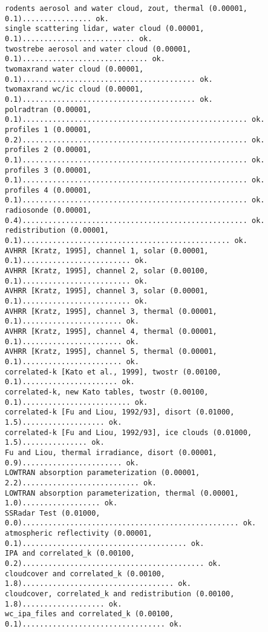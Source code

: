 \begin{enumerate}
\begin{lstlisting}[style=tinysize]
rodents aerosol and water cloud, zout, thermal (0.00001,   0.1)................ ok.
single scattering lidar, water cloud (0.00001,   0.1).......................... ok.
twostrebe aerosol and water cloud (0.00001,   0.1)............................. ok.
twomaxrand water cloud (0.00001,   0.1)........................................ ok.
twomaxrand wc/ic cloud (0.00001,   0.1)........................................ ok.
polradtran (0.00001,   0.1).................................................... ok.
profiles 1 (0.00001,   0.2).................................................... ok.
profiles 2 (0.00001,   0.1).................................................... ok.
profiles 3 (0.00001,   0.1).................................................... ok.
profiles 4 (0.00001,   0.1).................................................... ok.
radiosonde (0.00001,   0.4).................................................... ok.
redistribution (0.00001,   0.1)................................................ ok.
AVHRR [Kratz, 1995], channel 1, solar (0.00001,   0.1)......................... ok.
AVHRR [Kratz, 1995], channel 2, solar (0.00100,   0.1)......................... ok.
AVHRR [Kratz, 1995], channel 3, solar (0.00001,   0.1)......................... ok.
AVHRR [Kratz, 1995], channel 3, thermal (0.00001,   0.1)....................... ok.
AVHRR [Kratz, 1995], channel 4, thermal (0.00001,   0.1)....................... ok.
AVHRR [Kratz, 1995], channel 5, thermal (0.00001,   0.1)....................... ok.
correlated-k [Kato et al., 1999], twostr (0.00100,   0.1)...................... ok.
correlated-k, new Kato tables, twostr (0.00100,   0.1)......................... ok.
correlated-k [Fu and Liou, 1992/93], disort (0.01000,   1.5)................... ok.
correlated-k [Fu and Liou, 1992/93], ice clouds (0.01000,   1.5)............... ok.
Fu and Liou, thermal irradiance, disort (0.00001,   0.9)....................... ok.
LOWTRAN absorption parameterization (0.00001,   2.2)........................... ok.
LOWTRAN absorption parameterization, thermal (0.00001,   1.0).................. ok.
SSRadar Test (0.01000,   0.0).................................................. ok.
atmospheric reflectivity (0.00001,   0.1)...................................... ok.
IPA and correlated_k (0.00100,   0.2).......................................... ok.
cloudcover and correlated_k (0.00100,   1.8)................................... ok.
cloudcover, correlated_k and redistribution (0.00100,   1.8)................... ok.
wc_ipa_files and correlated_k (0.00100,   0.1)................................. ok.

\end{lstlisting}
\end{enumerate}
